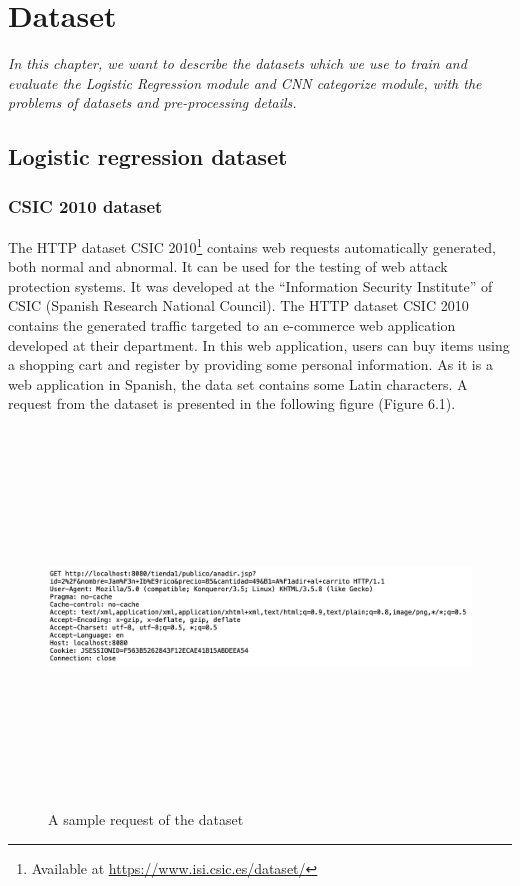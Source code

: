 \chapter{Dataset}
\label{chap:dataset}
	\textit{\hspace{0.5cm}In this chapter, we want to describe the datasets which we use to train and evaluate the Logistic Regression module and CNN categorize module, with the problems of datasets and pre-processing details.}
\minitoc
\section{Logistic regression dataset}
\label{sec:logistic_dataset}
\subsection{CSIC 2010 dataset}
\label{subsec:csic_2010}
\hspace{0.5cm}The HTTP dataset CSIC 2010\footnote{Available at \url{https://www.isi.csic.es/dataset/}} contains web requests automatically generated, both normal and abnormal. It can be used for the testing of web attack protection systems. It was developed at the ``Information Security Institute'' of CSIC (Spanish Research National Council). The HTTP dataset CSIC 2010 contains the generated traffic targeted to an e-commerce web application developed at their department. In this web application, users can buy items using a shopping cart and register by providing some personal information. As it is a web application in Spanish, the data set contains some Latin characters. A request from the dataset is presented in the following figure (Figure 6.1).

\begin{figure}[!h]
	\centering
	\includegraphics[width=\linewidth, height=10cm,keepaspectratio]{figures/dataset1.png}
  \caption{A sample request of the dataset}
\end{figure} 

